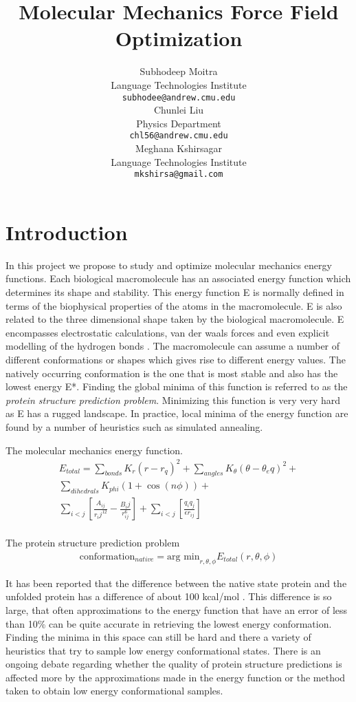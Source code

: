 \documentclass{article} %
\title{Molecular Mechanics Force Field Optimization}
\author{
Subhodeep Moitra\\
Language Technologies Institute\\
\texttt{subhodee@andrew.cmu.edu} \\
\And
Chunlei Liu \\
Physics Department \\
\texttt{chl56@andrew.cmu.edu} \\
\And
Meghana Kshirsagar \\
Language Technologies Institute\\
\texttt{mkshirsa@gmail.com}
}
\begin{document}
\maketitle

\section{Introduction}
In this project we propose to study and optimize molecular mechanics energy functions. Each biological macromolecule has an associated energy function which determines its shape and stability. This energy function E is normally defined in terms of the biophysical properties of the atoms in the macromolecule. E is also related to the three dimensional shape taken by the biological macromolecule. E encompasses electrostatic calculations, van der waals forces and even explicit modelling of the hydrogen bonds \cite{Boas2007}. The macromolecule can assume a number of different conformations or shapes which gives rise to different energy values. The natively occurring conformation is the one that is most stable and also has the lowest energy E*. Finding the global minima of this function is referred to as the \emph{protein structure prediction problem}. Minimizing this function is very very hard as E has a rugged landscape. In practice, local minima of the energy function are found by a number of heuristics such as simulated annealing. 

The molecular mechanics energy function.
\begin{align*}
E_{total} = \sum_{bonds}K_r(r-r_q)^2 + \sum_{angles}K_{\theta}(\theta-\theta_eq)^2 + \\
\sum_{dihedrals}K_{phi}(1+\cos(n\phi)) + \\
\sum_{i<j}\left[\frac{A_{ij}}{r_ij^{12}} - \frac{B_ij}{r_{ij}^6} \right] + \sum_{i<j}\left[\frac{q_iq_j}{\epsilon r_{ij}} \right] \\
\end{align*}

The protein structure prediction problem
\begin{align*}
\text{conformation}_{native} = \text{arg min}_{r,\theta,\phi} E_{total}(r,\theta,\phi)
\end{align*}


It has been reported that the difference between the native state protein and the unfolded protein has a difference of about 100 kcal/mol \cite{BakerDas2008}. This difference is so large, that often approximations to the energy function that have an error of less than 10\% can be quite accurate in retrieving the lowest energy conformation. Finding the minima in this space can still be hard and there a variety of heuristics that try to sample low energy conformational states. There is an ongoing debate regarding whether the quality of protein structure predictions is affected more by the approximations made in the energy function or the method taken to obtain low energy conformational samples\cite{BakerDas2008}. 
\end{document}
